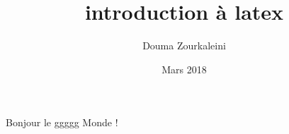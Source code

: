 \documentclass{article}
\title{introduction à latex}
\author{Douma Zourkaleini}
\date{Mars 2018}
\begin{document}
                   
  \maketitle
     Bonjour le ggggg Monde !
\end{document}
